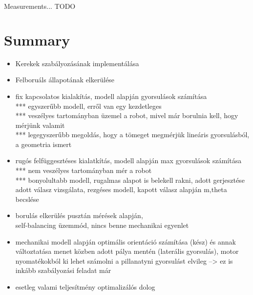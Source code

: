 \documentclass[12pt,english]{article}
\begin{document}
Measurements... TODO


\newpage
\section*{Summary}
\begin{itemize}
	\item Kerekek szabályozásának implementálása
	\item Felboruáls állapotának elkerülése
	\item fix kapcsolatos kialakítás, modell alapján gyorsulások számítása \\
	*** egyszerűbb modell, erről van egy kezdetleges \\
	*** veszélyes tartományban üzemel a robot, mivel már borulnia kell, hogy mérjünk valamit \\
	*** legegyszerűbb megoldás, hogy a tömeget megmérjük lineáris gyorsulásból, a geometria ismert \\
	\item rugós felfüggesztéses kialatkítás, modell alapján max gyorsulások számítása\\
	*** nem veszélyes tartományban mér a  robot \\
	*** bonyolultabb modell, rugalmas alapot is belekell rakni, adott gerjesztése adott válasz vizsgálata, rezgéses modell, kapott válasz alapján m,theta becslése \\
	\item borulás elkerülés pusztán mérések alapján,\\ self-balancing üzemmód, nincs benne mechanikai egyenlet
	\item mechanikai modell alapján optimális orientáció számítása (kész) és annak változtatása menet közben adott pálya mentén (laterális gyorsulás), motor nyomatékokból ki lehet számolni a pillanatyni gyorsulást elvileg --> ez is inkább szabályozási feladat már \\
	\item esetleg valami teljesítmény optimalizálós dolog
\end{itemize}


\newpage

\end{document}
